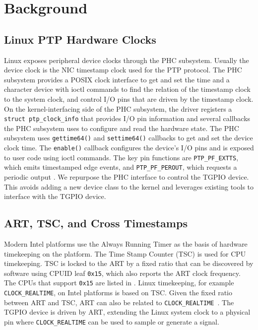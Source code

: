 \documentclass[conference,a4paper]{IEEEtran}
\newcommand{\ClRT}{\texttt{CLOCK\_REALTIME}\xspace}
\begin{document}
\section{Background}\label{sec:background}

\subsection{Linux PTP Hardware Clocks}

Linux exposes peripheral device clocks through the PHC subsystem. Usually the device clock is the NIC timestamp clock used for the PTP protocol. The PHC subsystem provides a POSIX clock interface to get and set the time and a character device with ioctl commands to find the relation of the timestamp clock to the system clock, and control I/O pins that are driven by the timestamp clock. On the kernel-interfacing side of the PHC subsystem, the driver registers a \texttt{struct ptp\_clock\_info} that provides I/O pin information and several callbacks the PHC subsystem uses to configure and read the hardware state. The PHC subsystem uses \texttt{gettime64()} and  \texttt{settime64()} callbacks to get and set the device clock time. The \texttt{enable()} callback configures the device's I/O pins and is exposed to user code using ioctl commands. The key pin functions are \texttt{PTP\_PF\_EXTTS}, which emits timestamped edge events, and \texttt{PTP\_PF\_PEROUT}, which requests a periodic output \cite{linux-ptp-docs,linux-ptp-header}. We repurpose the PHC interface to control the TGPIO device. This avoids adding a new device class to the kernel and leverages existing tools to interface with the TGPIO device.

\subsection{ART, TSC, and Cross Timestamps}

Modern Intel platforms use the Always Running Timer as the basis of hardware timekeeping on the platform. The Time Stamp Counter (TSC) is used for CPU timekeeping. TSC is locked to the ART by a fixed ratio that can be discovered by software using CPUID leaf \texttt{0x15}, which also reports the ART clock frequency. The CPUs that support \texttt{0x15} are listed in \cite{intel-sdm}. Linux timekeeping, for example \ClRT, on Intel platforms is based on TSC. Given the fixed ratio between ART and TSC, ART can also be related to \ClRT~\cite{linux-timekeeping-docs,linux-crosststamp-rfc}. The TGPIO device is driven by ART, extending the Linux system clock to a physical pin where \ClRT can be used to sample or generate a signal.
\end{document}
